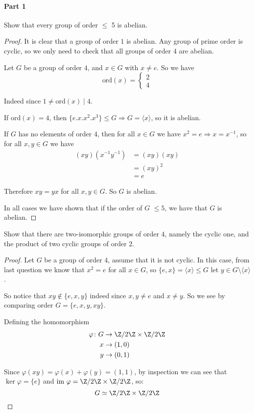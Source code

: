 \paragraph*{Part 1}
\begin{exercise}
Show that every group of order $\leq$ 5 is abelian.

\begin{proof}
It is clear that a group of order $1$ is abelian. Any group of prime order is cyclic, so we only need to check that all groups of order $4$ are abelian.

Let $G$ be a group of order $4$, and $x\in G$ with $x\neq e$. So we have \[\text{ord}(x) = \begin{cases}
2\\
4
\end{cases}\]

Indeed since $1\neq \text{ord}(x)\mid 4$.

If $\text{ord}(x) = 4$, then $\{e.x.x^2.x^3\} \leq G \Rightarrow G = \langle x \rangle$, so it is abelian. 

If $G$ has no elements of order $4$, then for all $x\in G$ we have $x^2 = e \Rightarrow x = x^{-1}$, so for all $x,y\in G$ we have\begin{align*}
(xy)(x^{-1}y^{-1}) &= (xy)(xy)\\
   &= {(xy)}^2\\
   &= e
\end{align*}

Therefore $xy = yx$ for all $x,y\in G$. So $G$ is abelian.

In all cases we have shown that if the order of $G$ $\leq 5$, we have that $G$ is abelian. 
\end{proof}
\end{exercise}

\begin{exercise}
Show that there are two-isomorphic groups of order $4$, namely the cyclic one, and the product of two cyclic groups of order $2$.

\begin{proof}
Let $G$ be a group of order $4$, assume that it is not cyclic. In this case, from last question we know that $x^2 = e$ for all $x\in G$, so $\{e,x\} = \langle x\rangle\leq G$ let $y\in G\setminus\langle x\rangle$. 

So notice that $xy \not\in \{e,x,y\}$ indeed since $x,y\not=e$ and $x\neq y$. So we see by comparing order $G = \{e,x,y,xy\}$.

Defining the homomorphism\begin{align*}
\varphi \colon G&\rightarrow \Z/2\Z \times \Z/2\Z\\
x&\rightarrow (1,0)\\
y&\rightarrow (0,1) 
\end{align*}

Since $\varphi(xy) = \varphi(x)+\varphi(y) = (1,1)$, by inspection we can see that $\ker \varphi = \{e\}$ and $\text{im } \varphi = \Z/2\Z \times \Z/2\Z$, so:\begin{equation*}
G\simeq \Z/2\Z \times \Z/2\Z
\end{equation*}
\end{proof}
\end{exercise}

